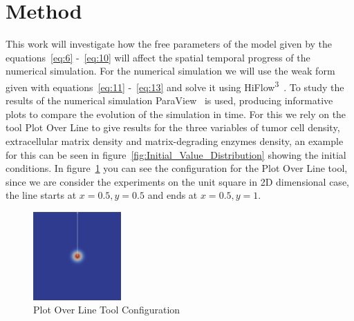 

\section{Method}\label{sec:method}

This work will investigate how the free parameters of the model given by the equations~\ref{eq:6} -~\ref{eq:10} will affect the spatial temporal progress of the numerical simulation. For the numerical simulation we will use the weak form given with equations~\ref{eq:11} -~\ref{eq:13} and solve it using HiFlow\textsuperscript{3}~\cite{hiflow3}. To study the results of the numerical simulation ParaView~\cite{paraview} is used, producing informative plots to compare the evolution of the simulation in time. For this we rely on the tool Plot Over Line to give results for the three variables of tumor cell density, extracellular matrix density and matrix-degrading enzymes density, an example for this can be seen in figure~\ref{fig:Initial_Value_Distribution} showing the initial conditions. In figure~\ref{fig:PlotOverLine} you can see the configuration for the Plot Over Line tool, since we are consider the experiments on the unit square in 2D dimensional case, the line starts at $x=0.5, y=0.5$ and ends at $x=0.5, y=1$.\newline
\begin{figure}[h]
    \centering
    \includegraphics[width=0.3\textwidth]{resources/images/plot_over_line_tool.png}
    \caption{Plot Over Line Tool Configuration}
    \label{fig:PlotOverLine}
\end{figure}

